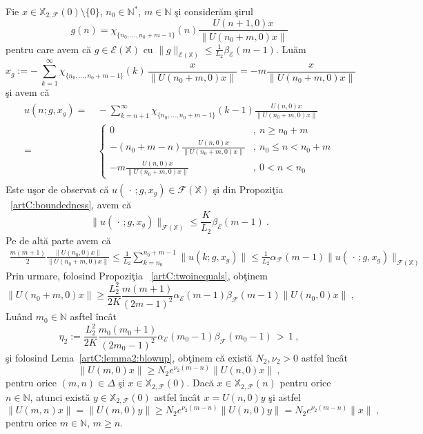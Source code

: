 \documentclass[ a4paper, 12pt]{report}
\newcommand{\E}{\mathcal{E}}
\newcommand{\F}{\mathcal{F}}
\newcommand{\N}{\mathbb{N}}
\newcommand{\X}{\mathbb{X}}
\theoremstyle{definition}
\theoremstyle{remark}
\numberwithin{equation}{section}
\begin{document}
Fie $x\in\X_{2,\F}(0)\setminus\{0\}$, $n_0\in\N^*$, $m\in\N$ \c si consider\u am \c sirul
\begin{equation}
g(n)= \chi_{\{n_0,...,n_0+m-1\}}(n) \frac{U(n+1,0)x}{\|U(n_0+m,0)x\|}
\end{equation}
pentru care avem c\u a $g\in\E(\X)$ cu $\|g\|_{\E(\X)}\leq \frac{1}{L_2}\beta_{\E}(m-1)$. Lu\u am
\begin{equation}
x_g:= -\ \sum_{k=1}^{\infty}\chi_{\{n_0,...,n_0+m-1\}}(k) \, \frac{x}{\|U(n_0+m,0)x\|} = -m \frac{x}{\|U(n_0+m,0)x\|}
\end{equation}
\c si avem c\u a
\begin{gather}
\begin{split}
u(n;g,x_g)=&\,-\sum_{k=n+1}^{\infty} \chi_{\{n_0,...,n_0+m-1\}}(k-1) \frac{U(n,0)x}{\|U(n_0+m,0)x\|}\\
=&\,
\begin{cases}
0 &,\ n\geq n_0+m\\
-(n_0+m - n) \frac{U(n,0)x}{\|U(n_0+m,0)x\|} &,\ n_0\leq n < n_0+m\\
- m \frac{U(n,0)x}{\|U(n_0+m,0)x\|} &,\ 0 < n <n_0
\end{cases}
\end{split}
\end{gather}
Este u\c sor de observat c\u a  $u(\,\cdot\,;g,x_g)\in\F(\X)$ \c si din Propozi\c tia ~\ref{artC:boundedness}, avem c\u a
$$\|u(\,\cdot\,;g,x_g)\|_{\F(\X)}\leq \frac{K}{L_2}\beta_{\E}(m-1)\ .$$
Pe de alt\u a parte avem c\u a
\begin{gather}
\frac{m(m+1)}{2} \frac{\|U(n_0,0)x\|}{\|U(n_0+m,0)x\|} \leq \frac{1}{L_2} \sum_{k=n_0}^{n_0+m-1}\|u(k;g,x_g)\|\leq
 \frac{1}{L_2} \alpha_{\F}(m-1) \|u(\,\cdot\,;g,x_g)\|_{\F(\X)}
\end{gather}
Prin urmare, folosind Propozi\c tia ~\ref{artC:twoinequals}, ob\c tinem
\begin{equation}
\|U(n_0+m,0)x\|\geq \frac{L_2^2}{2K} \frac{m(m+1)}{(2m-1)^2} \alpha_{\E}(m-1)\beta_{\F}(m-1)\|U(n_0,0)x\|\ ,
\end{equation}
Lu\^and $m_0\in\N$ asftel \^inc\^at
$$\eta_2:= \frac{L_2^2}{2K} \frac{m_0(m_0+1)}{(2m_0-1)^2} \alpha_{\E}(m_0-1)\beta_{\F}(m_0-1) \,>\,1\ ,$$
\c si folosind Lema~\ref{artC:lemma2:blowup}, ob\c tinem c\u a exist\u a  $N_2,\nu_2>0$ astfel \^inc\^at
$$\|U(m,0)x\|\geq N_2e^{\nu_2(m-n)}\|U(n,0)x\|\ ,$$
pentru orice $(m,n)\in\Delta$ \c si $x\in\X_{2,\F}(0)$.
Dac\u a  $x\in\X_{2,\F}(n)$ pentru orice $n\in\N$, atunci exist\u a  $y\in\X_{2,\F}(0)$ astfel \^inc\^at $x=U(n,0)y$ \c si astfel
$$\|U(m,n)x\|=\|U(m,0)y\|\geq N_2e^{\nu_2(m-n)}\|U(n,0)y\|= N_2e^{\nu_2(m-n)} \|x\|\ ,$$
pentru orice $m\in\N$, $m\geq n$.
\end{document}
